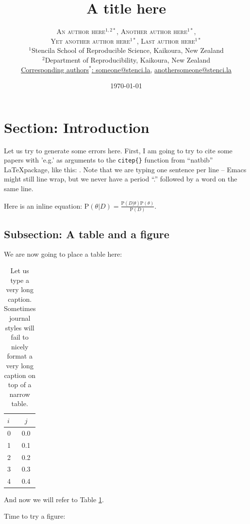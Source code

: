 \documentclass[oneside]{article}
\title{A title here} %
\author{\textsc{An author here$^{1,2*}$}, \textsc{Another author
    here$^{1*}$}, \\ \textsc{Yet another author here$^{1*}$},
  \textsc{Last author here$^{1*}$} \\
\small $^1$Stencila School of Reproducible Science, Kaikoura, New Zealand\\
\small $^2$Department of Reproducibility, Kaikoura, New Zealand\\
\small
\href{mailto:someone@stenci.la}{Corresponding authors$^*$: someone@stenci.la,}
\href{mailto:anothersomeone@stenci.la}{anothersomeone@stenci.la}
}
\date{\today} %
\begin{document}
\maketitle


\section{Section: Introduction}

Let us try to generate some errors here.
First, I am going to try to cite some papers with 'e.g.' as arguments
to the \texttt{citep\{\}} function from ``natbib'' \LaTeX package, like
this:
\citep[e.g.,][]{article1,article2,article3}.
Note that we are typing one sentence per line -- Emacs might still
line wrap, but we never have a period ``.'' followed by a word on the
same line.

Here is an inline equation: $\text{P}(\theta|D) =
\frac{\text{P}(D|\theta)\text{P}(\theta)}{\text{P}(D)}$.

\subsection{Subsection: A table and a figure}

We are now going to place a table here:

\begin{table}
\begin{center}
\begin{tabular}{lc}
\hline
$i$ & $j$ \\
\hline
0 & 0.0 \\
1 & 0.1 \\
2 & 0.2 \\
3 & 0.3 \\
4 & 0.4 \\
\hline
\end{tabular}
\end{center}
\caption{Let us type a very long caption. Sometimes journal styles will
  fail to nicely format a very long caption on top of a narrow table.
\label{tab:tab1}}
\end{table}

And now we will refer to Table \ref{tab:tab1}.

Time to try a figure:
\end{document}
